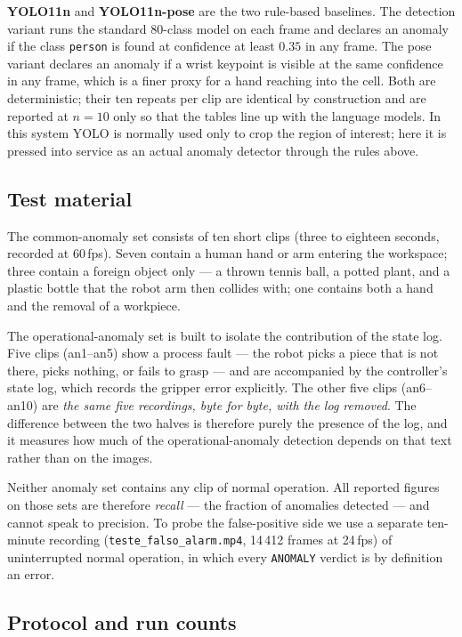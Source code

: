 \documentclass[11pt,a4paper]{article}
\begin{document}
\textbf{YOLO11n} and \textbf{YOLO11n-pose} are the two rule-based
baselines. The detection variant runs the standard 80-class model on each
frame and declares an anomaly if the class \texttt{person} is found at
confidence at least $0.35$ in any frame. The pose variant declares an
anomaly if a wrist keypoint is visible at the same confidence in any
frame, which is a finer proxy for a hand reaching into the cell. Both are
deterministic; their ten repeats per clip are identical by construction
and are reported at $n=10$ only so that the tables line up with the
language models. In this system YOLO is normally used only to crop the
region of interest; here it is pressed into service as an actual anomaly
detector through the rules above.

\subsection{Test material}

The common-anomaly set consists of ten short clips (three to eighteen
seconds, recorded at 60\,fps). Seven contain a human hand or arm entering
the workspace; three contain a foreign object only --- a thrown tennis
ball, a potted plant, and a plastic bottle that the robot arm then
collides with; one contains both a hand and the removal of a workpiece.

The operational-anomaly set is built to isolate the contribution of the
state log. Five clips (an1--an5) show a process fault --- the robot picks
a piece that is not there, picks nothing, or fails to grasp --- and are
accompanied by the controller's state log, which records the gripper
error explicitly. The other five clips (an6--an10) are \emph{the same five
recordings, byte for byte, with the log removed}. The difference between
the two halves is therefore purely the presence of the log, and it
measures how much of the operational-anomaly detection depends on that
text rather than on the images.

Neither anomaly set contains any clip of normal operation. All reported
figures on those sets are therefore \emph{recall} --- the fraction of
anomalies detected --- and cannot speak to precision. To probe the
false-positive side we use a separate ten-minute recording
(\texttt{teste\_falso\_alarm.mp4}, 14\,412 frames at 24\,fps) of
uninterrupted normal operation, in which every \texttt{ANOMALY} verdict is
by definition an error.

\subsection{Protocol and run counts}
\end{document}
